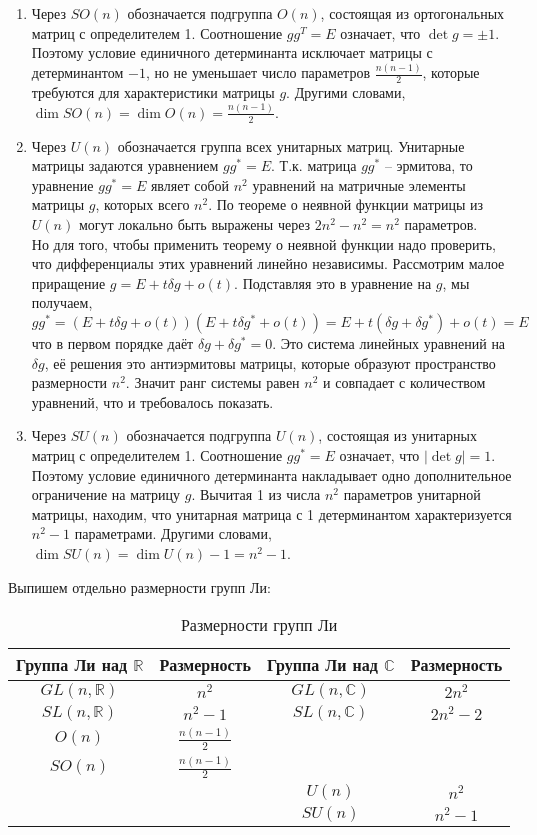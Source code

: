 \documentclass[12pt]{article}
\theoremstyle{definition}
\begin{document}
\begin{enumerate}
    \item Через $SO(n)$ обозначается подгруппа $O(n)$, состоящая из ортогональных матриц с определителем 1. Соотношение $gg^T=E$ означает, что $\det g=\pm 1$. Поэтому условие единичного детерминанта исключает матрицы с детерминантом $-1$, но не уменьшает число параметров $\frac{n(n-1)}{2}$, которые требуются для характеристики матрицы $g$. Другими словами, $\dim SO(n)=\dim O(n)=\frac{n(n-1)}{2}$.
    \item Через $U(n)$ обозначается группа всех унитарных матриц. Унитарные матрицы задаются уравнением $gg^*=E$. Т.к. матрица $gg^*$ -- эрмитова, то уравнение $gg^*=E$ являет собой $n^2$ уравнений на матричные элементы матрицы $g$, которых всего $n^2$. По теореме о неявной функции матрицы из $U(n)$ могут локально быть выражены через $2n^2-n^2=n^2$ параметров.\\
    Но для того, чтобы применить теорему о неявной функции надо проверить, что дифференциалы этих уравнений линейно независимы. Рассмотрим малое приращение $g=E+t\delta g+o(t)$. Подставляя это в уравнение на $g$, мы получаем, $gg^*=(E+t\delta g+o(t))(E+t\delta g^*+o(t))=E+t(\delta g+\delta g^*)+o(t)=E$ что в первом порядке даёт $\delta g+\delta g^*=0$. Это система линейных уравнений на $\delta g$, её решения это антиэрмитовы матрицы, которые образуют пространство размерности $n^2$. Значит ранг системы равен $n^2$ и совпадает с количеством уравнений, что и требовалось показать.
    \item Через $SU(n)$ обозначается подгруппа $U(n)$, состоящая из унитарных матриц с определителем 1. Соотношение $gg^*=E$ означает, что $|\det g|=1$. Поэтому условие единичного детерминанта накладывает одно дополнительное ограничение на матрицу $g$. Вычитая 1 из числа $n^2$ параметров унитарной матрицы, находим, что унитарная матрица с 1 детерминантом характеризуется $n^2-1$ параметрами. Другими словами, $\dim SU(n)=\dim U(n)-1=n^2-1$.
\end{enumerate}
Выпишем отдельно размерности групп Ли:
\begin{table}[h!]
    \centering
    \begin{tabular}{|c|c|c|c|}\hline
     Группа Ли над $\mathbb{R}$   & Размерность & Группа Ли над $\mathbb{C}$    & Размерность\\ \hline
     $GL(n,\mathbb{R})$ & $n^2$ & $GL(n,\mathbb{C})$ & $2n^2$\\ \hline
     $SL(n,\mathbb{R})$ & $n^2-1$ & $SL(n,\mathbb{C})$ & $2n^2-2$\\ \hline
     $O(n)$ & $\frac{n(n-1)}{2}$ & & \\ \hline
     $SO(n)$ & $\frac{n(n-1)}{2}$ & & \\ \hline
     & & $U(n)$ & $n^2$\\ \hline
     & & $SU(n)$ & $n^2-1$\\ \hline
    \end{tabular}
    \caption{Размерности групп Ли}
    \label{tab:my_label}
\end{table}
\end{document}
